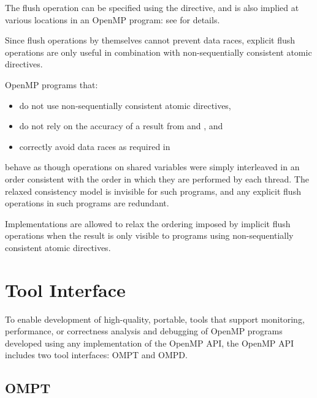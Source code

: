 The flush operation can be specified using the  directive, and is also implied at 
various locations in an OpenMP program: see  for details.

\begin{note}
Since flush operations by themselves cannot prevent data races, explicit flush 
operations are only useful in combination with non-sequentially consistent atomic 
directives.
\end{note}

OpenMP programs that:

\begin{itemize}[rightmargin=11ex]
\item do not use non-sequentially consistent atomic directives,

\item do not rely on the accuracy of a  result from 
 and , and

\item correctly avoid data races as required in  
\end{itemize}

behave as though operations on shared variables were simply interleaved in an order 
consistent with the order in which they are performed by each thread. The relaxed 
consistency model is invisible for such programs, and any explicit flush operations in 
such programs are redundant.

Implementations are allowed to relax the ordering imposed by implicit flush operations 
when the result is only visible to programs using non-sequentially consistent atomic 
directives.




\section{Tool Interface}
\label{subsec:Tool Support}

To enable development of high-quality, portable, tools that support
monitoring, performance, or correctness analysis and debugging of OpenMP programs
developed using any implementation of the OpenMP API,
the OpenMP API includes two tool interfaces: OMPT and OMPD.

\subsection{OMPT}


